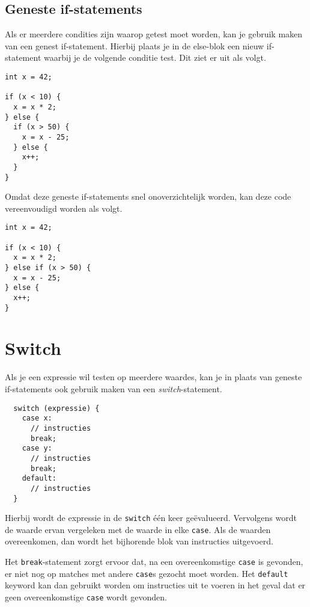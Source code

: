 \documentclass[11pt,fleqn]{book} %
\begin{document}
\subsection{Geneste if-statements}
Als er meerdere condities zijn waarop getest moet worden, kan je gebruik maken van een genest if-statement. Hierbij plaats je in de else-blok een nieuw if-statement waarbij je de volgende conditie test. Dit ziet er uit als volgt.

\begin{example}
	\phantom{ }
	\begin{verbatim}
int x = 42;

if (x < 10) {
  x = x * 2;
} else {
  if (x > 50) {
    x = x - 25;
  } else {
    x++;
  }
}
	\end{verbatim}
\end{example}

\noindent
Omdat deze geneste if-statements snel onoverzichtelijk worden, kan deze code vereenvoudigd worden als volgt.

\begin{example}[Else-if]
	\phantom{ }
	\begin{verbatim}
int x = 42;

if (x < 10) {
  x = x * 2;
} else if (x > 50) {
  x = x - 25;
} else {
  x++;
}
	\end{verbatim}
\end{example}

\section{Switch}
Als je een expressie wil testen op meerdere waardes, kan je in plaats van geneste if-statements ook gebruik maken van een \emph{switch}-statement.

\begin{definition}[Switch]
	\phantom{ }
	\begin{verbatim}
  switch (expressie) {
    case x:
      // instructies
      break;
    case y:
      // instructies
      break;
    default:
      // instructies
  }
	\end{verbatim}
\end{definition}

\noindent
Hierbij wordt de expressie in de \texttt{switch} één keer geëvalueerd. Vervolgens wordt de waarde ervan vergeleken met de waarde in elke \texttt{case}. Als de waarden overeenkomen, dan wordt het bijhorende blok van instructies uitgevoerd. 

Het \texttt{break}-statement zorgt ervoor dat, na een overeenkomstige \texttt{case} is gevonden, er niet nog op matches met andere \texttt{case}s gezocht moet worden. Het \texttt{default} keyword kan dan gebruikt worden om instructies uit te voeren in het geval dat er geen overeenkomstige \texttt{case} wordt gevonden.
\end{document}
